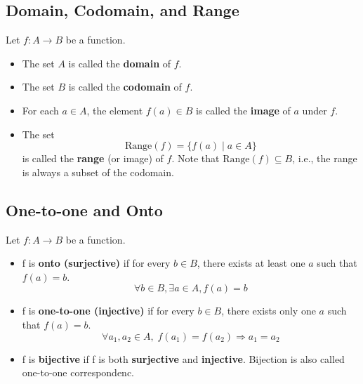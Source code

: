 \documentclass[11pt]{article}
\begin{document}
\subsection{Domain, Codomain, and Range}
Let $f : A \to B$ be a function.
\begin{itemize}
    \item The set $A$ is called the \textbf{domain} of $f$.
    \item The set $B$ is called the \textbf{codomain} of $f$.
    \item For each $a \in A$, the element $f(a) \in B$ is called the \textbf{image} of $a$ under $f$.
    \item The set 
    \[
        \text{Range}(f) = \{ f(a) \mid a \in A \}
    \]
    is called the \textbf{range} (or image) of $f$.  
    Note that $\text{Range}(f) \subseteq B$, i.e., the range is always a subset of the codomain.
\end{itemize}
\begin{figure}[H]
    \centering
\end{figure}
\subsection{One-to-one and Onto}
Let $f: A\to B$ be a function. 
\begin{itemize}
    \item f is \textbf{onto (surjective)} if for every $b \in B$, there exists at least one $a$ such that $f(a) = b$.
        \[
            \forall b\in B, \exists a\in A, f(a) = b
        \]
    \item f is \textbf{one-to-one (injective)} if for every $b\in B$, there exists only one $a$ such that $f(a) = b$.
        \[
            \forall a_1, a_2 \in A,\; f(a_1) = f(a_2) \Rightarrow a_1 = a_2
        \]
    \item f is \textbf{bijective} if f is both \textbf{surjective} and \textbf{injective}. Bijection is also called one-to-one correspondenc.
\end{itemize}
\end{document}
